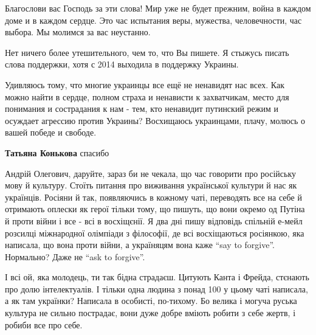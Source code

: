 \begin{itemize}

Благослови вас Господь за эти слова! Мир уже не будет прежним, война в каждом
доме и в каждом сердце. Это час испытания веры, мужества,
человечности, час выбора. Мы молимся за вас неустанно.


Нет ничего более утешительного, чем то, что Вы пишете. Я стыжусь писать слова
поддержки, хотя с 2014 выходила в поддержку Украины.

Удивляюсь тому, что многие украинцы все ещё не ненавидят нас всех. Как можно
найти в сердце, полном страха и ненависти к захватчикам, место для понимания и
сострадания к нам - тем, кто ненавидит путинский режим и осуждает агрессию
против Украины? Восхищаюсь украинцами, плачу, молюсь о вашей победе и свободе.

\textbf{Татьяна Конькова} спасибо


Андрій Олегович, даруйте, зараз би не чекала, що час говорити про російську
мову й культуру. Стоїть питання про виживання української культури й нас як
українців. Росіяни й так, появляючись в кожному чаті, переводять все на себе й
отримають оплески як герої тільки тому, що пишуть, що вони окремо од Путіна й
проти війни і все - всі в восхіщєнії. Я два дні пишу відповідь спільній е-мейл
розсилці міжнародної олімпіади з філософії, де всі восхіщаються росіянкою, яка
написала, що вона проти війни, а україняцям вона каже \enquote{say to forgive}.
Нормально? Даже не \enquote{ask to forgive}.

І всі ой, яка молодець, ти так бідна страдаєш. Цитують Канта і Фрейда, стєнають
про долю інтелектуалів. І тільки одна людина з понад 100 у цьому чаті написала,
а як там українки? Написала в особисті, по-тихому. Бо велика і могуча руська
культура не сильно пострадає, вони дуже добре вміють робити з себе жертв, і
робиби все про себе.


\end{itemize} %
